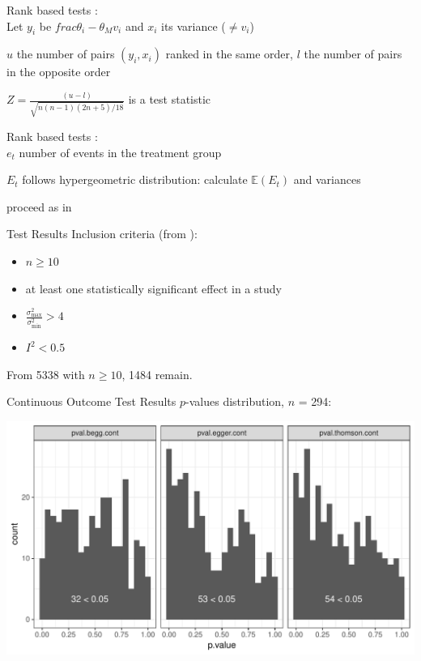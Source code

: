 \documentclass[english]{beamer}\usepackage[]{graphicx}\usepackage[]{color}
\makeatletter
\def\maxwidth{ %
  \ifdim\Gin@nat@width>\linewidth
    \linewidth
  \else
    \Gin@nat@width
  \fi
}
\newenvironment{knitrout}{}{} %
\makeatother
\begin{document}
\begin{frame}{Rank based tests}
\citet{begg.ties}: \\
Let $y_{i}$ be $frac{\theta_i - \theta_M}{v_i}$ and $x_i$ its variance ($\neq v_i$)

$u$ the number of pairs $(y_{i}, x_{i})$ ranked in the same order, $l$
the number of pairs in the opposite order

$Z = \frac{(u - l)}{\sqrt{n(n-1)(2n + 5)/18}}$  is a test statistic
\end{frame}

\begin{frame}{Rank based tests}
\citet{Schwarzer}: \\
$e_t$ number of events in the treatment group

$E_t$ follows hypergeometric distribution: calculate $\mathbb{E}(E_{t})$ and variances

proceed as in \citet{begg.ties}
\end{frame}


\begin{frame}{Test Results}
Inclusion criteria (from \citet{Ioannidis2007}):
\begin{itemize}
\item $n \geq 10$
\item at least one statistically significant effect in a study
\item $\frac{\sigma_{\textrm{max}}^2}{\sigma_{\textrm{min}}^2} > 4$
\item $I^2 < 0.5$
\end{itemize}

From 5338 with $n \geq 10$, 1484 remain.
\end{frame}



\begin{frame}[fragile]{Continuous Outcome Test Results}
$p$-values distribution, $n$ = 294:

\vspace{-2mm}
\begin{knitrout}
\color{fgcolor}
\includegraphics[width=\maxwidth]{figure/unnamed-chunk-7-1} 

\end{knitrout}
\end{frame}
\end{document}
